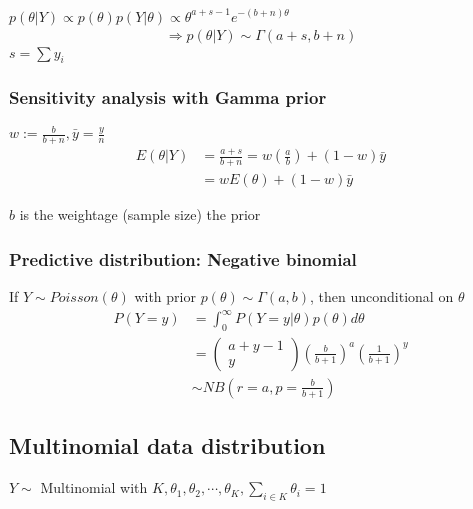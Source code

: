     $p(\theta|Y)\propto p(\theta) p(Y|\theta) \propto 
    \theta^{a+s-1}e^{-(b+n)\theta}$
    \begin{align*}
        \Rightarrow p(\theta|Y)\sim \Gamma(a+s, b+n)
    \end{align*}
    $s=\sum y_i$

    \subsubsection{Sensitivity analysis with Gamma prior}
    $w := \frac{b}{b+n}, \bar{y} = \frac{y}{n}$
    \begin{align*}
        E(\theta|Y) &= \frac{a+s}{b+n} = 
        w\left(\frac{a}{b}\right) + (1-w)\bar y\\
                    &= wE(\theta) + (1-w)\bar y
    \end{align*}

    $b$ is the weightage (sample size) the prior

    \subsubsection{Predictive distribution: Negative binomial}

    If $Y\sim Poisson(\theta)$ with prior $p(\theta)\sim
    \Gamma(a, b)$, then unconditional on $\theta$
    \begin{align*}
        P(Y=y) &= \int_0^\infty
        P(Y=y|\theta)p(\theta)d\theta\\
               &=\begin{pmatrix}
                   a + y - 1\\
                   y
               \end{pmatrix}
               \left(\frac{b}{b+1}\right)^a
               \left(\frac{1}{b+1}\right)^y\\
               &\sim NB\left(r=a, p=\frac{b}{b+1}\right)
    \end{align*}

    \subsection{Multinomial data distribution}

    $Y \sim$ Multinomial with $K, \theta_1, \theta_2,
    \cdots, \theta_K, \sum_{i\in K} \theta_i = 1$

